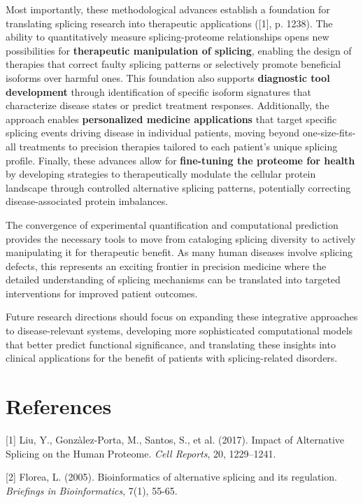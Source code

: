 \documentclass[12pt,a4paper]{article}
\begin{document}
Most importantly, these methodological advances establish a foundation for translating splicing research into therapeutic applications ([1], p. 1238). The ability to quantitatively measure splicing-proteome relationships opens new possibilities for \textbf{therapeutic manipulation of splicing}, enabling the design of therapies that correct faulty splicing patterns or selectively promote beneficial isoforms over harmful ones. This foundation also supports \textbf{diagnostic tool development} through identification of specific isoform signatures that characterize disease states or predict treatment responses. Additionally, the approach enables \textbf{personalized medicine applications} that target specific splicing events driving disease in individual patients, moving beyond one-size-fits-all treatments to precision therapies tailored to each patient's unique splicing profile. Finally, these advances allow for \textbf{fine-tuning the proteome for health} by developing strategies to therapeutically modulate the cellular protein landscape through controlled alternative splicing patterns, potentially correcting disease-associated protein imbalances.

The convergence of experimental quantification and computational prediction provides the necessary tools to move from cataloging splicing diversity to actively manipulating it for therapeutic benefit. As many human diseases involve splicing defects, this represents an exciting frontier in precision medicine where the detailed understanding of splicing mechanisms can be translated into targeted interventions for improved patient outcomes.

Future research directions should focus on expanding these integrative approaches to disease-relevant systems, developing more sophisticated computational models that better predict functional significance, and translating these insights into clinical applications for the benefit of patients with splicing-related disorders.

\section{References}

[1] Liu, Y., Gonzàlez-Porta, M., Santos, S., et al. (2017). Impact of Alternative Splicing on the Human Proteome. \textit{Cell Reports}, 20, 1229–1241.

[2] Florea, L. (2005). Bioinformatics of alternative splicing and its regulation. \textit{Briefings in Bioinformatics}, 7(1), 55-65.
\end{document}
